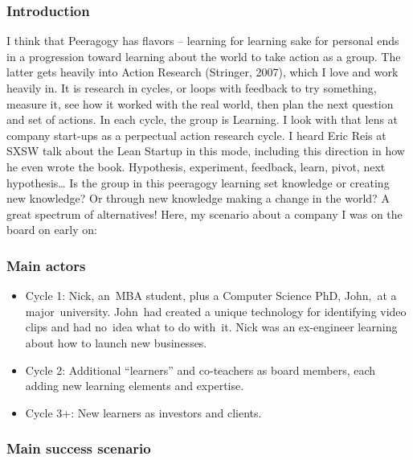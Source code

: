 \subsubsection{Introduction}

I think that Peeragogy has flavors -- learning for learning sake for
personal ends in a progression toward learning about the world to take
action as a group. The latter gets heavily into Action Research
(Stringer, 2007), which I love and work heavily in. It is research in
cycles, or loops with feedback to try something, measure it, see how it
worked with the real world, then plan the next question and set of
actions. In each cycle, the group is Learning. I look with that lens at
company start-ups as a perpectual action research cycle. I heard Eric
Reis at SXSW talk about the Lean Startup in this mode, including this
direction in how he even wrote the book. Hypothesis, experiment,
feedback, learn, pivot, next hypothesis\ldots{} Is the group in this
peeragogy learning set knowledge or creating new knowledge? Or through
new knowledge making a change in the world? A great spectrum of
alternatives! Here, my scenario about a company I was on the board on
early on:

\subsubsection{Main actors}

\begin{itemize}
\item
  Cycle 1: Nick, an~MBA student, plus a Computer Science PhD, John,~at a
  major~university. John~had created a unique technology for identifying
  video clips and had no~idea what to do with~it. Nick was an
  ex-engineer learning about how to launch new businesses.
\end{itemize}

\begin{itemize}
\item
  Cycle 2: Additional ``learners'' and co-teachers as board members,
  each adding new learning elements and expertise.
\end{itemize}

\begin{itemize}
\item
  Cycle 3+: New learners as investors and clients.
\end{itemize}

\subsubsection{Main success scenario}

